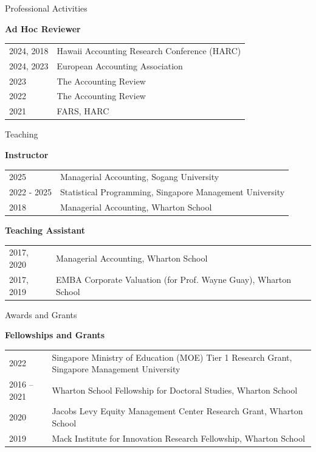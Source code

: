 \documentclass{resume} %
\begin{document}
\begin{rSection}{Professional Activities}
\vspace{0.2cm}


{\bf Ad Hoc Reviewer} \medskip

\begin{tabular}{p{2cm}p{15.5cm}}
2024, 2018 &  Hawaii Accounting Research Conference (HARC) \medskip \\
2024, 2023 & European Accounting Association \medskip \\
2023 & The Accounting Review \medskip \\
2022 & The Accounting Review \medskip \\
2021 & FARS, HARC \medskip \\
\end{tabular}


\end{rSection}
\begin{rSection}{Teaching}

{\bf Instructor} \medskip

\begin{tabular}{p{2cm}p{15.5cm}}
2025 & Managerial Accounting, Sogang University  \medskip \\
2022 - 2025 & Statistical Programming, Singapore Management University \medskip \\
2018 & Managerial Accounting, Wharton School
\end{tabular}

{\bf Teaching Assistant} \medskip \\
\begin{tabular}{p{2cm}p{15.5cm}}
2017, 2020 & Managerial Accounting, Wharton School \medskip \\
2017, 2019 & EMBA Corporate Valuation (for Prof. Wayne Guay), Wharton School \medskip \\
\end{tabular}
\end{rSection}

\begin{rSection}{Awards and Grants}

{\bf Fellowships and Grants} \medskip

\begin{tabular}{p{2cm}p{15.5cm}}
2022 & Singapore Ministry of Education (MOE) Tier 1 Research Grant, Singapore Management University \medskip \\
2016 -- 2021 & Wharton School Fellowship for Doctoral Studies, Wharton School \medskip \\
2020 & Jacobs Levy Equity Management Center Research Grant, Wharton School \medskip \\
2019 & Mack Institute for Innovation Research Fellowship, Wharton School
\end{tabular}

\end{rSection}
\end{document}
